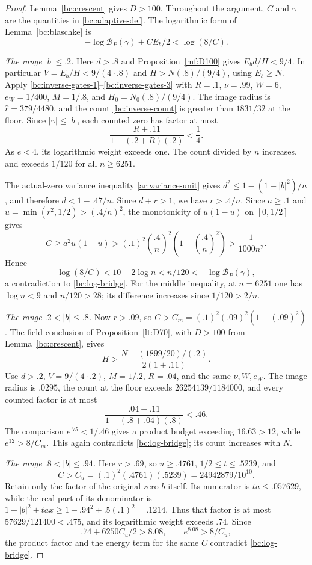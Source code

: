 \documentclass[11pt,reqno]{amsart}
\numberwithin{equation}{section}
\theoremstyle{definition}
\theoremstyle{remark}
\begin{document}
\begin{proof}
Lemma~\ref{bc:crescent} gives $D>100$.  Throughout the argument,
$C$ and $\gamma$ are the quantities in \eqref{bc:adaptive-def}.
The logarithmic form of Lemma~\ref{bc:blaschke} is
\begin{equation}\label{bc:log-bridge}
 -\log\mathcal B_P(\gamma)+CE_b/2<\log(8/C).
\end{equation}

\emph{The range $|b|\leq.2$.}
Here $d>.8$ and Proposition~\ref{mf:D100} gives
$E_bd/H<9/4$.  In particular
$V=E_b/H<9/(4\cdot.8)$ and
$H>N(.8)/(9/4)$, using $E_b\geq N$.
Apply \eqref{bc:inverse-gates-1}--\eqref{bc:inverse-gates-3}
with $R=.1$, $\nu=.99$, $W=6$, $e_W=1/400$,
$M=1/.8$, and $H_0=N_0(.8)/(9/4)$.
The image radius is $\widehat r=379/4480$, and the count
\eqref{bc:inverse-count} is greater than $1831/32$ at the floor.
Since $|\gamma|\leq|b|$, each counted zero has factor at most
\[
 \frac{R+.11}{1-(.2+R)(.2)}<\frac14.
\]
As $e<4$, its logarithmic weight exceeds one.
The count divided by $n$ increases, and exceeds $1/120$ for all
$n\geq6251$.

The actual-zero variance inequality \eqref{ar:variance-unit}
gives $d^2\leq1-(1-|b|^2)/n$, and therefore $d<1-.47/n$.
Since $d+r>1$, we have $r>.4/n$.
Since $a\geq.1$ and $u=\min(r^2,1/2)>(.4/n)^2$,
the monotonicity of $u(1-u)$ on $[0,1/2]$ gives
\[
 C\geq a^2u(1-u)
 >(.1)^2\left(\frac{.4}{n}\right)^2
       \left(1-\left(\frac{.4}{n}\right)^2\right)
 >\frac1{1000n^2}.
\]
Hence
\[
 \log(8/C)<10+2\log n<n/120
       <-\log\mathcal B_P(\gamma),
\]
a contradiction to \eqref{bc:log-bridge}.
For the middle inequality, at $n=6251$ one has
$\log n<9$ and $n/120>28$; its difference increases since
$1/120>2/n$.

\emph{The range $.2<|b|\leq.8$.}
Now $r>.09$, so
$C>C_m=(.1)^2(.09)^2(1-(.09)^2)$.
The field conclusion of Proposition~\ref{lt:D70}, with $D>100$
from Lemma~\ref{bc:crescent}, gives
\[
 H>\frac{N-(1899/20)/(.2)}{2(1+.11)}.
\]
Use $d>.2$, $V=9/(4\cdot.2)$, $M=1/.2$,
$R=.04$, and the same $\nu,W,e_W$.
The image radius is $.0295$, the count at the floor exceeds
$26254139/1184000$, and every counted factor is at most
\[
 \frac{.04+.11}{1-(.8+.04)(.8)}<.46.
\]
The comparison $e^{.75}<1/.46$ gives a product budget exceeding
$16.63>12$, while $e^{12}>8/C_m$.
This again contradicts \eqref{bc:log-bridge}; its count increases
with $N$.

\emph{The range $.8<|b|\leq.94$.}
Here $r>.69$, so $u\geq.4761$, $1/2\leq t\leq.5239$, and
\[
 C>C_u=(.1)^2(.4761)(.5239)=24942879/10^{10}.
\]
Retain only the factor of the original zero $b$ itself.
Its numerator is $ta\leq.057629$, while the real part of its
denominator is
$1-|b|^2+tax\geq1-.94^2+.5(.1)^2=.1214$.
Thus that factor is at most $57629/121400<.475$, and its logarithmic
weight exceeds $.74$.  Since
\[
 .74+6250C_u/2>8.08,\qquad e^{8.08}>8/C_u,
\]
the product factor and the energy term for the same $C$ contradict
\eqref{bc:log-bridge}.


\end{proof}
\end{document}
